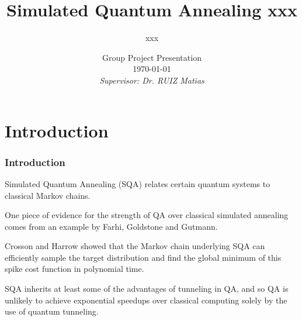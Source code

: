 \documentclass[11pt,compress,mathserif]{beamer}
\begin{document}
\title[xxx]{Simulated Quantum Annealing xxx}

\author[xxx]{xxx } 
\date{\footnotesize Group Project Presentation \\ \today \\
\vspace{0.4cm}
\emph{Supervisor: Dr. RUIZ Matias}}


\frame{\titlepage}


\frame{\begin{small}\tableofcontents\end{small}}


\section[Intro]{Introduction}

\begin{frame}\frametitle{Introduction}
\bit
\item Simulated Quantum Annealing (SQA) relates certain quantum systems to classical Markov chains.

\item One piece of evidence for the strength of QA over classical simulated annealing comes from an example by Farhi, Goldstone and Gutmann.

\item Crosson and Harrow showed that the Markov chain underlying SQA can efficiently sample the target distribution and find the global minimum of this spike cost function in polynomial time. 

\item SQA inherits at least some of the advantages of tunneling in QA, and so QA is unlikely to achieve exponential speedups over classical computing solely by the use of quantum tunneling. 
\eit
\end{frame}

\end{document}

